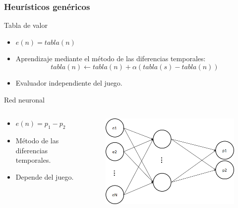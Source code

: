 \documentclass[10pt]{beamer}
\begin{document}
\begin{frame}[squeeze]
\frametitle{Heurísticos genéricos}
\begin{block}{Tabla de valor}
{\small
\begin{itemize}
	\item $e(n) = tabla(n)$
	\item Aprendizaje mediante el método de las diferencias temporales:
	\begin{displaymath}
tabla(n) \leftarrow tabla(n) + \alpha(tabla(s) - tabla(n))
\end{displaymath}
	\item \textcolor{verde}{Evaluador independiente del juego.}
\end{itemize}
}
\end{block}

\begin{block}{Red neuronal}
{\small
\begin{columns}
\begin{column}{0.4\linewidth}
\begin{itemize}
\item $e(n) = p_1 - p_2$
\item Método de las diferencias temporales.
\item \textcolor{rojo}{Depende del juego.}
\end{itemize}
\end{column}

\begin{column}{0.5\linewidth}
\begin{figure}[t]
\centering
\includegraphics[scale=0.2]{imagenes/redNeuronal.png}
\label{fig:jug_redNeuronal}
\end{figure}
\end{column}
\end{columns}
}
\end{block}
\end{frame}
\end{document}
